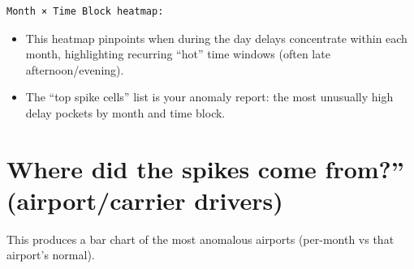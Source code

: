 \documentclass[11pt]{article}
\begin{document}
    
    \begin{verbatim}
Month × Time Block heatmap:
\end{verbatim}

\begin{itemize}
\item
  This heatmap pinpoints when during the day delays concentrate within
  each month, highlighting recurring ``hot'' time windows (often late
  afternoon/evening).
\item
  The ``top spike cells'' list is your anomaly report: the most
  unusually high delay pockets by month and time block.
\end{itemize}

    \section{Where did the spikes come from?'' (airport/carrier
drivers)}\label{where-did-the-spikes-come-from-airportcarrier-drivers}

This produces a bar chart of the most anomalous airports (per-month vs
that airport's normal).
\end{document}
